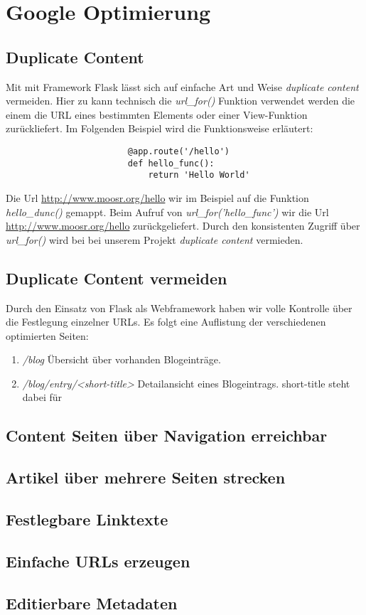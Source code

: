 \chapter{Google Optimierung}

\section{Duplicate Content}
Mit mit Framework Flask lässt sich auf einfache Art und Weise \emph{duplicate
content} vermeiden. Hier zu kann technisch die \emph{url\_for()} Funktion
verwendet werden die einem die URL eines bestimmten Elements oder einer
View-Funktion zurückliefert. Im Folgenden Beispiel wird die Funktionsweise
erläutert:

\begin{verbatim}
                        @app.route('/hello')
                        def hello_func():
                            return 'Hello World'
\end{verbatim}

Die Url \url{http://www.moosr.org/hello} wir im Beispiel auf die Funktion
\emph{hello\_dunc()} gemappt. Beim Aufruf von \emph{url\_for('hello\_func')} wir
die Url \url{http://www.moosr.org/hello} zurückgeliefert. Durch den konsistenten
Zugriff über \emph{url\_for()} wird bei bei unserem Projekt
\emph{duplicate content} vermieden.



\section{Duplicate Content vermeiden}
Durch den Einsatz von Flask als Webframework haben wir volle Kontrolle über
die Festlegung einzelner URLs. Es folgt eine Auflistung der verschiedenen
optimierten Seiten:
\begin{enumerate}
    \item \emph{/blog} Übersicht über vorhanden Blogeinträge.
    \item \emph{/blog/entry/<short-title>} Detailansicht eines Blogeintrags.
    short-title steht dabei für 
                                        
\end{enumerate}

\section{Content Seiten über Navigation erreichbar}


\section{Artikel über mehrere Seiten strecken}
\section{Festlegbare Linktexte}
\section{Einfache URLs erzeugen}


\section{Editierbare Metadaten}

